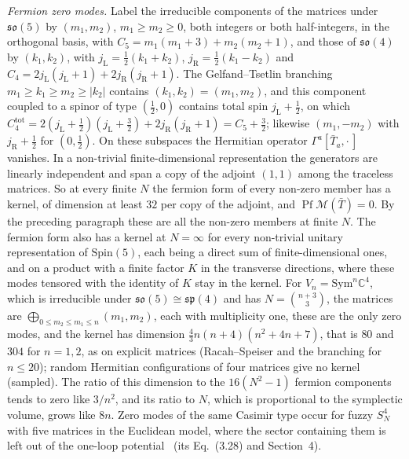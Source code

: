 \emph{Fermion zero modes.} Label the irreducible components of the matrices under \(\mathfrak{so}(5)\) by \((m_1,m_2)\), \(m_1\ge m_2\ge0\), both integers or both half-integers, in the orthogonal basis, with \(C_5=m_1(m_1+3)+m_2(m_2+1)\), and those of \(\mathfrak{so}(4)\) by \((k_1,k_2)\), with \(j_{\mathrm L}=\tfrac12(k_1+k_2)\), \(j_{\mathrm R}=\tfrac12(k_1-k_2)\) and \(C_4=2j_{\mathrm L}(j_{\mathrm L}+1)+2j_{\mathrm R}(j_{\mathrm R}+1)\). The Gelfand--Tsetlin branching \(m_1\ge k_1\ge m_2\ge|k_2|\) contains \((k_1,k_2)=(m_1,m_2)\), and this component coupled to a spinor of type \((\tfrac12,0)\) contains total spin \(j_{\mathrm L}+\tfrac12\), on which \(C_4^{\mathrm{tot}}=2(j_{\mathrm L}+\tfrac12)(j_{\mathrm L}+\tfrac32)+2j_{\mathrm R}(j_{\mathrm R}+1)=C_5+\tfrac32\); likewise \((m_1,-m_2)\) with \(j_{\mathrm R}+\tfrac12\) for \((0,\tfrac12)\). On these subspaces the Hermitian operator \(\Gamma^a[\bar T_a,\cdot\,]\) vanishes. In a non-trivial finite-dimensional representation the generators are linearly independent and span a copy of the adjoint \((1,1)\) among the traceless matrices. So at every finite \(N\) the fermion form of every non-zero member has a kernel, of dimension at least \(32\) per copy of the adjoint, and \(\operatorname{Pf}\mathcal M(\bar T)=0\). By the preceding paragraph these are all the non-zero members at finite \(N\). The fermion form also has a kernel at \(N=\infty\) for every non-trivial unitary representation of \(\mathrm{Spin}(5)\), each being a direct sum of finite-dimensional ones, and on a product with a finite factor \(K\) in the transverse directions, where these modes tensored with the identity of \(K\) stay in the kernel. For \(V_n=\mathrm{Sym}^n\mathbb C^4\), which is irreducible under \(\mathfrak{so}(5)\cong\mathfrak{sp}(4)\) and has \(N=\binom{n+3}3\), the matrices are \(\bigoplus_{0\le m_2\le m_1\le n}(m_1,m_2)\), each with multiplicity one, these are the only zero modes, and the kernel has dimension \(\tfrac43n(n+4)(n^2+4n+7)\), that is \(80\) and \(304\) for \(n=1,2\), as on explicit matrices (Racah--Speiser and the branching for \(n\le20\)); random Hermitian configurations of four matrices give no kernel (sampled). The ratio of this dimension to the \(16(N^2-1)\) fermion components tends to zero like \(3/n^2\), and its ratio to \(N\), which is proportional to the symplectic volume, grows like \(8n\). Zero modes of the same Casimir type occur for fuzzy \(S^4_N\) with five matrices in the Euclidean model, where the sector containing them is left out of the one-loop potential~\cite{Steinacker2015S4} (its Eq.~(3.28) and Section~4).

